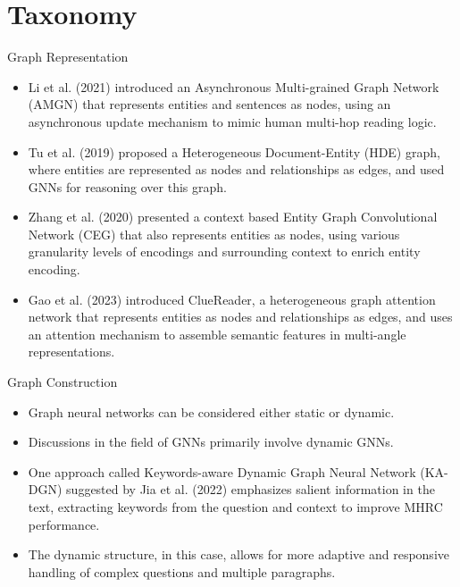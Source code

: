 \documentclass[10pt]{beamer}
\begin{document}
\section{Taxonomy}

\begin{frame}[fragile]{Graph Representation}
  \begin{itemize}
    \item Li et al. (2021) \cite{RN131} introduced an Asynchronous Multi-grained Graph Network (AMGN) that represents entities and sentences as nodes, using an asynchronous update mechanism to mimic human multi-hop reading logic.
    \item Tu et al. (2019) \cite{RN124} proposed a Heterogeneous Document-Entity (HDE) graph, where entities are represented as nodes and relationships as edges, and used GNNs for reasoning over this graph.
    \item Zhang et al. (2020) \cite{RN170} presented a context based Entity Graph Convolutional Network (CEG) that also represents entities as nodes, using various granularity levels of encodings and surrounding context 
to enrich entity encoding.
    \item Gao et al. (2023) \cite{RN136} introduced ClueReader, a heterogeneous graph attention network that represents entities as nodes and relationships as edges, and uses an attention mechanism to assemble semantic features in multi-angle representations.
  \end{itemize}
\end{frame}

\begin{frame}[fragile]{Graph Construction}
  \begin{itemize}
    \item Graph neural networks can be considered either static or dynamic.
    \item Discussions in the field of GNNs primarily involve dynamic GNNs.
    \item One approach called Keywords-aware Dynamic Graph Neural Network (KA-DGN) suggested by Jia et al. (2022) \cite{RN171b} emphasizes salient information in the text, extracting keywords from the question and context to improve MHRC performance.
    \item The dynamic structure, in this case, allows for more adaptive and responsive handling of complex questions and multiple paragraphs.
  \end{itemize}
\end{frame}
\end{document}

